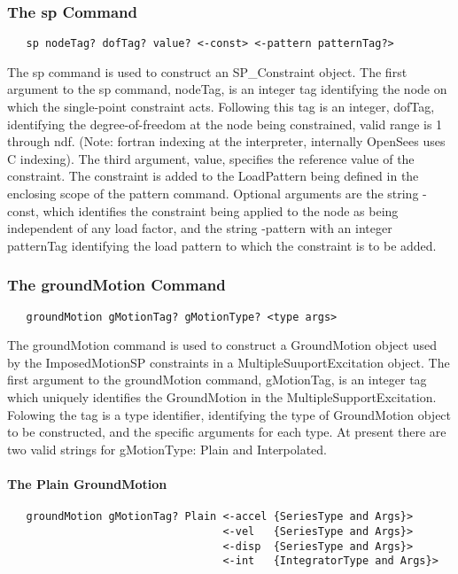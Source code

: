 \documentclass[12pt]{article}
\begin{document}
\subsubsection{The sp Command}
{\sf\small
\begin{verbatim}
   sp nodeTag? dofTag? value? <-const> <-pattern patternTag?>
\end{verbatim}
}

The sp command is used to construct an SP\_Constraint object. The first
argument to the sp command, nodeTag, is an integer tag identifying the
node on which the single-point constraint acts. Following this tag is 
an integer, dofTag, identifying the degree-of-freedom at the node being
constrained, valid range is 1 through ndf. (Note: fortran indexing at
the interpreter, internally OpenSees uses C indexing). The third argument,
value, specifies the reference value of the constraint. The constraint is
added to the LoadPattern being defined in the enclosing scope of the
pattern command. Optional arguments are the string -const, which
identifies the constraint being applied to the node as being independent of
any load factor, and the string -pattern with an integer patternTag
identifying the load pattern to which the constraint is to be added.


\subsubsection{The groundMotion Command}
{\sf\small
\begin{verbatim}
   groundMotion gMotionTag? gMotionType? <type args>
\end{verbatim}
}

The groundMotion command is used to construct a GroundMotion object
used by the ImposedMotionSP constraints in a MultipleSuuportExcitation
object. The first argument to the groundMotion command, gMotionTag, is
an integer tag which uniquely identifies the GroundMotion in the
MultipleSupportExcitation. Folowing the tag is a type identifier,
identifying the type of GroundMotion object to be constructed, and the
specific arguments for each type. At present there are two valid
strings for gMotionType: Plain and Interpolated.

\paragraph{\small The Plain GroundMotion}

{\sf\small
\begin{verbatim}
   groundMotion gMotionTag? Plain <-accel {SeriesType and Args}>
                                  <-vel   {SeriesType and Args}>
                                  <-disp  {SeriesType and Args}>
                                  <-int   {IntegratorType and Args}>
\end{verbatim}
}
\end{document}
